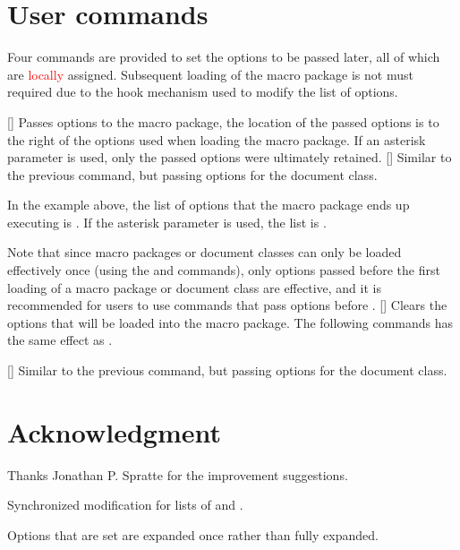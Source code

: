 \documentclass[load-preamble+]{cnltx-doc}
\begin{document}
\section{User commands}
Four commands are provided to set the options to be passed later, all of which are \textcolor{red}{locally} assigned. Subsequent loading of the macro package is not must required due to the hook mechanism used to modify the list of options.
\begin{commands}
  [\sarg{}]
  Passes options to the macro package, the location of the passed options is to the right of the options used when loading the macro package. If an asterisk parameter is used, only the passed options were ultimately retained.
  [\sarg{}]
  Similar to the previous command, but passing options for the document class.

  In the example above, the list of options that the  macro package ends up executing is . If the asterisk parameter is used, the list is .

  Note that since macro packages or document classes can only be loaded effectively once (using the  and  commands), only options passed before the first loading of a macro package or document class are effective, and it is recommended for users to use commands that pass options before .
  []
  Clears the options that will be loaded into the macro package. The following commands has the same effect as \code{*}.
  \begin{sourcecode}
  \end{sourcecode}
  []
  Similar to the previous command, but passing options for the document class.
\end{commands}

\section{Acknowledgment}
Thanks Jonathan P. Spratte for the improvement suggestions.

\appendix
\begin{changelog}[simple]
  \begin{version}[v = 1.01,date = 2024/07/15]
  \item Synchronized modification for lists of  and .
  \item Options that are set are expanded once rather than fully expanded.
  \end{version}
\end{changelog}
\nocite{*}
\end{document}
